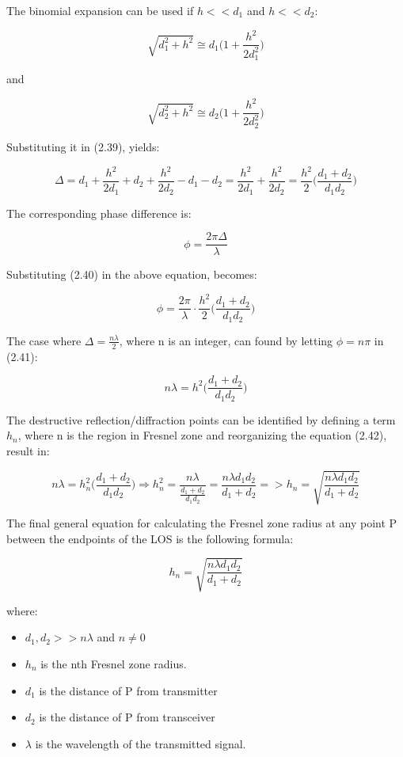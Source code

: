 The binomial expansion can be used if $h<<d_1$ and $h<<d_2$:

$$\sqrt{d_1^2+h^2} \cong d_1 \Big(1+\frac{h^2}{2d_1^2} \Big) $$

and

$$\sqrt{d_2^2+h^2} \cong d_2 \Big(1+\frac{h^2}{2d_2^2} \Big) $$

Substituting it in (2.39), yields:

\begin{equation}
  \Delta=d_1+\frac{h^2}{2d_1}+d_2+\frac{h^2}{2d_2}-d_1-d_2 = \frac{h^2}{2d_1} + \frac{h^2}{2d_2} = \frac{h^2}{2}\Big(\frac{d_1+d_2}{d_1d_2}\Big)
\end{equation}

The corresponding phase difference is: 

$$\phi = \frac{2\pi \Delta}{\lambda}$$

Substituting (2.40) in the above equation, becomes: 

\begin{equation}
  \phi = \frac{2\pi}{\lambda} \cdot \frac{h^2}{2}\Big(\frac{d_1+d_2}{d_1d_2}\Big)
\end{equation}

The case where $\Delta = \frac{n\lambda}{2}$, where n is an integer, can found by letting  $\phi = n\pi$ in (2.41):

\begin{equation}
  n\lambda=h^2\Big(\frac{d_1+d_2}{d_1d_2}\Big)
\end{equation}

The destructive reflection/diffraction points can be identified by defining a term $h_n$, where n is the region in Fresnel zone and reorganizing the equation (2.42), result in:

\begin{equation}
  n\lambda=h_n^2\Big(\frac{d_1+d_2}{d_1d_2}\Big)\Rightarrow h_n^2= \frac{n\lambda}{\frac{d_1+d_2}{d_1d_2}}=\frac{n\lambda d_1d_2}{d_1+d_2} => h_n = \sqrt{\frac{n\lambda d_1d_2}{d_1+d_2}}
\end{equation}

The final general equation for calculating the Fresnel zone radius at any point P between the endpoints of the LOS is the following formula: 

\begin{equation}
h_n = \sqrt{\frac{n\lambda d_1d_2}{d_1+d_2}}
\end{equation}

where:

\begin{itemize}
  \item $d_1,d_2>>n\lambda$ and $n \neq 0$
  \item $h_n$ is the nth Fresnel zone radius.
  \item $d_1$ is the distance of P from transmitter
  \item $d_2$ is the distance of P from transceiver
  \item $\lambda$ is the wavelength of the transmitted signal.
\end{itemize}

